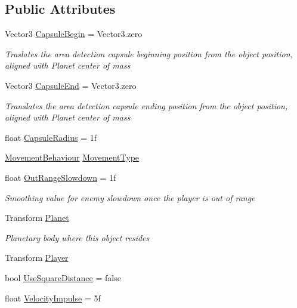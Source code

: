 \subsection*{Public Attributes}
\begin{DoxyCompactItemize}
\item 
Vector3 \hyperlink{class_g_t_core_1_1_enemies_1_1_follow_bomb_movement_a80e25eb90a06eabb7bd3d45c2b0d8d24}{Capsule\+Begin} = Vector3.\+zero
\begin{DoxyCompactList}\small\item\em Traslates the area detection capsule beginning position from the object position, aligned with Planet center of mass \end{DoxyCompactList}\item 
Vector3 \hyperlink{class_g_t_core_1_1_enemies_1_1_follow_bomb_movement_a77d4cf25b4178b1e27b8c7251b1239db}{Capsule\+End} = Vector3.\+zero
\begin{DoxyCompactList}\small\item\em Translates the area detection capsule ending position from the object position, aligned with Planet center of mass \end{DoxyCompactList}\item 
float \hyperlink{class_g_t_core_1_1_enemies_1_1_follow_bomb_movement_aaf76d148d9b094d5a61e1412e345196f}{Capsule\+Radius} = 1f
\item 
\hyperlink{class_g_t_core_1_1_enemies_1_1_follow_bomb_movement_adf9532fc09595ec68cbe32713697fa48}{Movement\+Behaviour} \hyperlink{class_g_t_core_1_1_enemies_1_1_follow_bomb_movement_accd113a49589727e231c06b1cf02d79c}{Movement\+Type}
\item 
float \hyperlink{class_g_t_core_1_1_enemies_1_1_follow_bomb_movement_aa6e51f2d1015ecae0f9c30ce8e1c55bc}{Out\+Range\+Slowdown} = 1f
\begin{DoxyCompactList}\small\item\em Smoothing value for enemy slowdown once the player is out of range \end{DoxyCompactList}\item 
Transform \hyperlink{class_g_t_core_1_1_enemies_1_1_follow_bomb_movement_a41203fb8ac8a63c736780e054903fea8}{Planet}
\begin{DoxyCompactList}\small\item\em Planetary body where this object resides \end{DoxyCompactList}\item 
Transform \hyperlink{class_g_t_core_1_1_enemies_1_1_follow_bomb_movement_adaab5b48a877d03861e6f1e40838306e}{Player}
\item 
bool \hyperlink{class_g_t_core_1_1_enemies_1_1_follow_bomb_movement_a6acfe7e9ede561ff19f064d5f887b18b}{Use\+Square\+Distance} = false
\item 
float \hyperlink{class_g_t_core_1_1_enemies_1_1_follow_bomb_movement_a3665241c62f4b791a62f51a1e4238b8c}{Velocity\+Impulse} = 5f
\end{DoxyCompactItemize}


